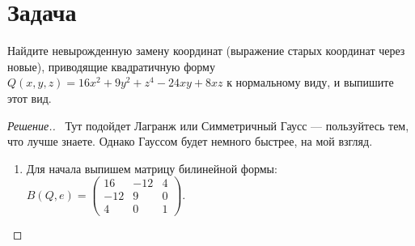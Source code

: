\documentclass[a4paper]{article}
\theoremstyle{remark}
\begin{document}
    \section*{Задача }
        Найдите невырожденную замену координат (выражение старых координат через 
        новые), приводящие квадратичную форму $Q(x, y, z) = 16x^2 + 9y^2 + z^4 - 24xy + 8xz$
        к нормальному виду, и выпишите этот вид.
        \begin{proof}[Решение.] \ 
            Тут подойдет Лагранж или Симметричный Гаусс --- пользуйтесь 
            тем, что лучше знаете. Однако Гауссом будет немного быстрее, на мой взгляд.
            \begin{enumerate}
                \item Для начала выпишем матрицу билинейной формы: $B(Q, e) = 
                \begin{pmatrix}
                    16 & -12 & 4 \\
                    -12 & 9 & 0 \\
                    4 & 0 & 1 
                \end{pmatrix}
                $. 


\end{enumerate}
\end{proof}
\end{document}
